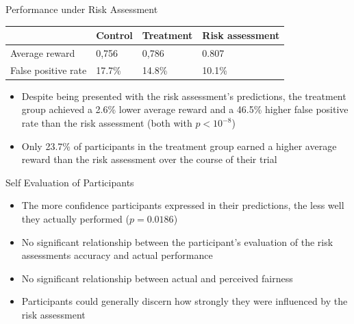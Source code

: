 \documentclass[11pt]{beamer}
\begin{document}
\begin{frame}{Performance under Risk Assessment}
\begin{table}[]
	\begin{tabular}{@{}llll}
		\toprule
		& \textbf{Control} & \textbf{Treatment} &\textbf{Risk assessment} \\ \midrule
		Average reward      & 0,756            & 0,786 & 0.807               \\ \midrule
		False positive rate & 17.7\%           & 14.8\% & 10.1\%             \\ \bottomrule
	\end{tabular}
\end{table}
\begin{itemize}
	\item  Despite being presented with the risk assessment’s predictions, the treatment group achieved
	a 2.6\% lower average reward and a 46.5\% higher false positive rate
	than the risk assessment (both with $p < 10^{-8}$)
	\item  Only 23.7\% of participants in the treatment group earned a higher average reward than
	the risk assessment over the course of their trial
\end{itemize}
\end{frame}


\begin{frame}{Self Evaluation of Participants}
\begin{itemize}
	\item The more confidence participants expressed in their predictions, the less well they actually performed ($p=0.0186$)
	\item No significant relationship between the participant's evaluation of the risk assessments accuracy and actual performance
	\item No significant relationship between actual and perceived fairness
	\item Participants could generally discern how strongly they were influenced by the risk assessment
\end{itemize}
\end{frame}
\end{document}
